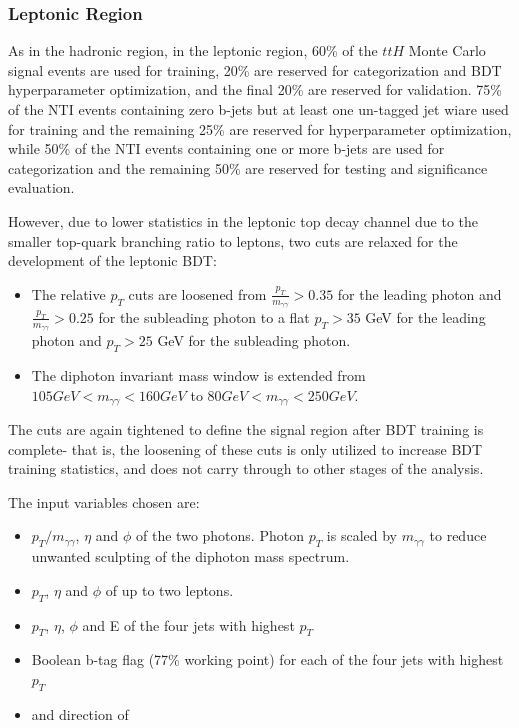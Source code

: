 \subsubsection{Leptonic Region} \label{sec:SBBDTlep} 

As in the hadronic region, in the leptonic region, 60\% of the $ttH$ Monte Carlo signal events are used for training, 20\% are reserved for categorization and BDT hyperparameter optimization, and the final 20\% are reserved for validation. 75\% of the NTI events containing zero b-jets but at least one un-tagged jet wiare used for training and the remaining 25\% are reserved for hyperparameter optimization, while 50\% of the NTI events containing one or more b-jets are used for categorization and the remaining 50\% are reserved for testing and significance evaluation.

However, due to lower statistics in the leptonic top decay channel due to the smaller top-quark branching ratio to leptons, two cuts are relaxed for the development of the leptonic BDT:

\begin{itemize}
\item The relative $p_{T}$ cuts are loosened from $\frac{p_{T}}{m_{\gamma\gamma}} > 0.35$ for the leading photon and $\frac{p_{T}}{m_{\gamma\gamma}} > 0.25$ for the subleading photon to a flat $p_{T} > 35$ GeV for the leading photon and $p_{T} > 25$ GeV for the subleading photon.
\item The diphoton invariant mass window is extended from $105 GeV < m_{\gamma \gamma} < 160 GeV$ to $80 GeV < m_{\gamma \gamma} < 250 GeV$.
\end{itemize}

The cuts are again tightened to define the signal region after BDT training is complete- that is, the loosening of these cuts is only utilized to increase BDT training statistics, and does not carry through to other stages of the analysis.

The input variables chosen are: 

\begin{itemize}
\item $p_T/m_{\gamma \gamma}$, $\eta$ and $\phi$ of the two photons. Photon $p_{T}$ is scaled by $m_{\gamma \gamma}$ to reduce unwanted sculpting of the diphoton mass spectrum.
\item $p_T$, $\eta$ and $\phi$ of up to two leptons. 
\item $p_T$, $\eta$, $\phi$ and E of the four jets with highest $p_{T}$
\item Boolean b-tag flag (77\% working point) for each of the four jets with highest $p_{T}$
\item \MET and direction of \MET
\end{itemize}

